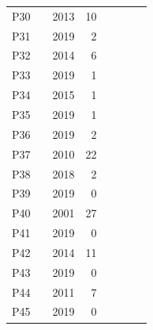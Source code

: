 \documentclass[manuscript,screen]{acmart}
\begin{document}
\begin{table}[]
\begin{tabular}{llrrcccl}
P30   & \citet{goodwin2013key}              & 2013 & 10         &                  &       &            &               \\
P31   & \citet{zeng2019funpianoar}          & 2019 & 2          &                  &       &            &               \\
P32   & \citet{de2014infrared}              & 2014 & 6          &                  &       &            &               \\
P33   & \citet{molloy2019mixed}             & 2019 & 1          &                  &       &            &               \\
P34   &  \citet{zaqout2015augmented}        & 2015 & 1          &                  &       &            &               \\
P35   & \citet{cai2019design}               & 2019 & 1          &                  &       &            &               \\
P36   & \citet{gerry2019adept}              & 2019 & 2          &                  &       &            &               \\
P37   & \citet{zhang2010affordable}         & 2010 & 22         &                  &       &            &               \\
P38   &  \citet{pan2018pilot}               & 2018 & 2          &                  &       &            &               \\
P39   &  \citet{cai2019design}              & 2019 & 0          &                  &       &            &               \\
P40   &  \citet{poupyrev2001augmented}      & 2001 & 27         &                  &       &            &               \\
P41   & \citet{sandnes2019enhanced}         & 2019 & 0          &                  &       &            &               \\
P42   & \citet{kim2014ar}                   & 2014 & 11         &                  &       &            &               \\
P43   & \citet{zeng2019new}                 & 2019 & 0          &                  &       &            &               \\
P44   &  \citet{xiao2011duet}               & 2011 & 7          &                  &       &            &               \\
P45   & \citet{xu20195}                     & 2019 & 0          &                  &       &            &               \\

\end{tabular}
\end{table}
\end{document}
